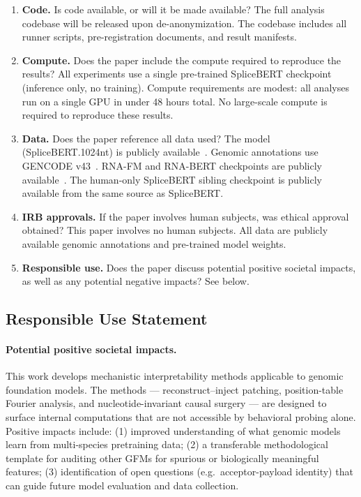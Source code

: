 \begin{enumerate}
\item \textbf{Code.}
Is code available, or will it be made available?
\answerYes{} The full analysis codebase will be released upon de-anonymization. The codebase includes all runner scripts, pre-registration documents, and result manifests.

\item \textbf{Compute.}
Does the paper include the compute required to reproduce the results?
\answerYes{} All experiments use a single pre-trained SpliceBERT checkpoint (inference only, no training). Compute requirements are modest: all analyses run on a single GPU in under 48 hours total. No large-scale compute is required to reproduce these results.

\item \textbf{Data.}
Does the paper reference all data used?
\answerYes{} The model (SpliceBERT.1024nt) is publicly available~\citep{chen2024splicebert}. Genomic annotations use GENCODE v43~\citep{mudge2023gencode}. RNA-FM and RNA-BERT checkpoints are publicly available~\citep{chen2022rnafm,akiyama2022rnabert}. The human-only SpliceBERT sibling checkpoint is publicly available from the same source as SpliceBERT.

\item \textbf{IRB approvals.}
If the paper involves human subjects, was ethical approval obtained?
\answerNA{} This paper involves no human subjects. All data are publicly available genomic annotations and pre-trained model weights.

\item \textbf{Responsible use.}
Does the paper discuss potential positive societal impacts, as well as any potential negative impacts?
\answerYes{} See below.

\end{enumerate}

\subsection*{Responsible Use Statement}

\paragraph{Potential positive societal impacts.}
This work develops mechanistic interpretability methods applicable to genomic foundation models. The methods — reconstruct--inject patching, position-table Fourier analysis, and nucleotide-invariant causal surgery — are designed to surface internal computations that are not accessible by behavioral probing alone. Positive impacts include: (1) improved understanding of what genomic models learn from multi-species pretraining data; (2) a transferable methodological template for auditing other GFMs for spurious or biologically meaningful features; (3) identification of open questions (e.g.\ acceptor-payload identity) that can guide future model evaluation and data collection.

